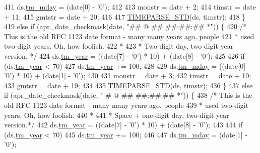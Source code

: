 \begin{DoxyCode}
411         ds.\hyperlink{structapr__time__exp__t_a6c09a274f011841e9e988c3c9504848a}{tm\_mday} = (date[0] - \textcolor{charliteral}{'0'});
412 
413         monstr = date + 2;
414         timstr = date + 11;
415         gmtstr = date + 20;
416 
417         \hyperlink{apr__date_8c_a574f7cc7ba24c017bff5d6c41cf5903d}{TIMEPARSE\_STD}(ds, timstr);
418     \}
419     \textcolor{keywordflow}{else} \textcolor{keywordflow}{if} (apr\_date\_checkmask(date, \textcolor{stringliteral}{"## @$$ ## ##:##:## *"})) \{
420         \textcolor{comment}{/* This is the old RFC 1123 date format - many many years ago, people}
421 \textcolor{comment}{         * used two-digit years.  Oh, how foolish.}
422 \textcolor{comment}{         *}
423 \textcolor{comment}{         * Two-digit day, two-digit year version. */}
424         ds.\hyperlink{structapr__time__exp__t_a35c32245be49279a6689e34bcd6e534a}{tm\_year} = ((date[7] - \textcolor{charliteral}{'0'}) * 10) + (date[8] - \textcolor{charliteral}{'0'});
425 
426         \textcolor{keywordflow}{if} (ds.\hyperlink{structapr__time__exp__t_a35c32245be49279a6689e34bcd6e534a}{tm\_year} < 70)
427             ds.\hyperlink{structapr__time__exp__t_a35c32245be49279a6689e34bcd6e534a}{tm\_year} += 100;
428 
429         ds.\hyperlink{structapr__time__exp__t_a6c09a274f011841e9e988c3c9504848a}{tm\_mday} = ((date[0] - \textcolor{charliteral}{'0'}) * 10) + (date[1] - \textcolor{charliteral}{'0'});
430 
431         monstr = date + 3;
432         timstr = date + 10;
433         gmtstr = date + 19;
434 
435         \hyperlink{apr__date_8c_a574f7cc7ba24c017bff5d6c41cf5903d}{TIMEPARSE\_STD}(ds, timstr);
436     \} 
437     \textcolor{keywordflow}{else} \textcolor{keywordflow}{if} (apr\_date\_checkmask(date, \textcolor{stringliteral}{" # @$$ ## ##:##:## *"})) \{
438         \textcolor{comment}{/* This is the old RFC 1123 date format - many many years ago, people}
439 \textcolor{comment}{         * used two-digit years.  Oh, how foolish.}
440 \textcolor{comment}{         *}
441 \textcolor{comment}{         * Space + one-digit day, two-digit year version.*/}
442         ds.\hyperlink{structapr__time__exp__t_a35c32245be49279a6689e34bcd6e534a}{tm\_year} = ((date[7] - \textcolor{charliteral}{'0'}) * 10) + (date[8] - \textcolor{charliteral}{'0'});
443 
444         \textcolor{keywordflow}{if} (ds.\hyperlink{structapr__time__exp__t_a35c32245be49279a6689e34bcd6e534a}{tm\_year} < 70)
445             ds.\hyperlink{structapr__time__exp__t_a35c32245be49279a6689e34bcd6e534a}{tm\_year} += 100;
446 
447         ds.\hyperlink{structapr__time__exp__t_a6c09a274f011841e9e988c3c9504848a}{tm\_mday} = (date[1] - \textcolor{charliteral}{'0'});

\end{DoxyCode}
